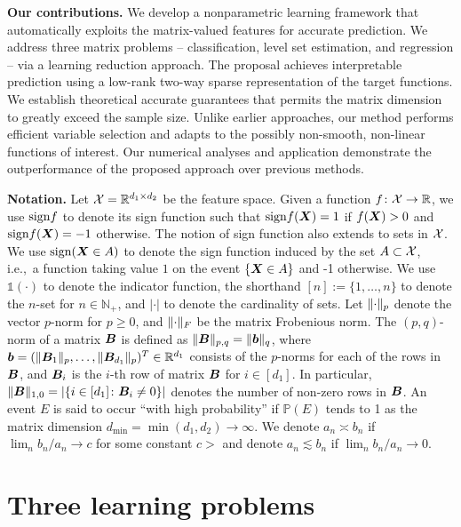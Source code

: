 \documentclass[11pt]{article}
\theoremstyle{definition}
\def\sign{\textup{sign}}
\begin{document}
{\bf Our contributions.} We develop a nonparametric learning framework that automatically exploits the matrix-valued features for accurate prediction. We address three matrix problems -- classification, level set estimation, and regression -- via a learning reduction approach. The proposal achieves interpretable prediction using a low-rank two-way sparse representation of the target functions. We establish theoretical accurate guarantees that permits the matrix dimension to greatly exceed the sample size. Unlike earlier approaches, our method performs efficient variable selection and adapts to the possibly non-smooth, non-linear functions of interest. Our numerical analyses and application demonstrate the outperformance of the proposed approach over previous methods. 


 
{\bf Notation.} Let $\mathcal{X}=\mathbb{R}^{d_1\times d_2}$ be the feature space. Given a function $f\colon \mathcal{X} \to \mathbb{R}$, we use $\sign f$ to denote its sign function such that $\sign f(\mX)=1$ if $f(\bm X)>0$ and $\sign f(\mX)=-1$ otherwise. The notion of sign function also extends to sets in $\mathcal{X}$. We use $\sign (\mX\in A)$ to denote the sign function induced by the set $A\subset\mathcal{X}$, i.e.,\ a function taking value $1$ on the event $\{\bm X\in A\}$ and -1 otherwise. We use $\mathds{1}(\cdot)$ to denote the indicator function, the shorthand $[n]:=\{1,\ldots,n\}$ to denote the $n$-set for $n\in\mathbb{N}_{+}$, and $|\cdot|$ to denote the cardinality of sets. Let $\lVert\cdot\rVert_p$ denote the vector $p$-norm for $p\geq 0$, and $\lVert\cdot\rVert_F$ be the matrix Frobenious norm. The $(p,q)$-norm of a matrix $\bm B$ is defined as $\lVert\bm B\rVert_{p,q}=\lVert\bm{b}\rVert_q$, where $\bm{b}=(\lVert\bm B_1\rVert_p,\ldots,\lVert\bm B_{d_1}\rVert_p)^T\in\mathbb{R}^{d_1}$ consists of the $p$-norms for each of the rows in $\bm B$, and $\bm B_i$ is the $i$-th row of matrix $\bm B$ for $i\in[d_1]$. In particular, $\lVert\bm B\rVert_{1,0}=|\{i\in [d_1]\colon \bm B_i\neq 0\}|$ denotes the number of non-zero rows in $\bm B$. An event $E$ is said to occur ``with high probability'' if $\mathbb{P}(E)$ tends to 1 as the matrix dimension $d_{\min}=\min(d_1,d_2)\to\infty$. We denote $a_n\asymp b_n$ if $\lim_n b_n/a_n\rightarrow c$ for some constant $c>$ and denote $a_n\lesssim b_n$ if $\lim_n b_n/a_n\rightarrow 0.$ 

\section{Three learning problems}
\end{document}
